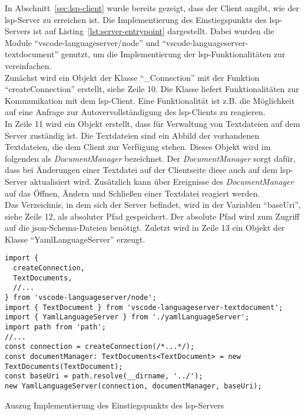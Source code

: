 In Abschnitt~\ref{sec:lsp-client} wurde bereits gezeigt, dass der Client angibt, wie der \ac{lsp}-Server zu erreichen ist.
Die Implementierung des Einstiegspunkts des \ac{lsp}-Servers ist auf Listing~\ref{lst:server-entrypoint} dargestellt.
Dabei wurden die Module ``vscode-languageserver/node'' und ``vscode-languageserver-textdocument'' genutzt, um die
Implementierung der \ac{lsp}-Funktionalitäten zur vereinfachen.
\\
Zunächst wird ein Objekt der Klasse ``\_Connection'' mit der Funktion ``createConnection'' erstellt, siehe Zeile 10.
Die Klasse liefert Funktionalitäten zur Kommunikation mit dem \ac{lsp}-Client.
Eine Funktionalität ist z.B. die Möglichkeit auf eine Anfrage zur Autovervollständigung des \ac{lsp}-Clients zu reagieren.
\\
In Zeile 11 wird ein Objekt erstellt, dass für Verwaltung von Textdateien auf dem Server zuständig ist.
Die Textdateien sind ein Abbild der vorhandenen Textdateien, die dem Client zur Verfügung stehen.
Dieses Objekt wird im folgenden als \textit{DocumentManager} bezeichnet.
Der \textit{DocumentManager} sorgt dafür, dass bei Änderungen einer Textdatei auf der Clientseite diese auch auf dem \ac{lsp}-Server aktualisiert wird.
Zusätzlich kann über Ereignisse des \textit{DocumentManager} auf das Öffnen, Ändern und Schließen einer Textdatei reagiert werden.
\\
Das Verzeichnis, in dem sich der Server befindet, wird in der Variablen ``baseUri'', siehe Zeile 12, als absoluter Pfad gespeichert.
Der absolute Pfad wird zum Zugriff auf die \ac{json}-Schema-Dateien benötigt.
Zuletzt wird in Zeile 13 ein Objekt der Klasse ``YamlLanguageServer'' erzeugt.

\begin{listing}[htp]
  \begin{verbatim}
import { 
  createConnection, 
  TextDocuments, 
  //...
} from 'vscode-languageserver/node';
import { TextDocument } from 'vscode-languageserver-textdocument';
import { YamlLanguageServer } from './yamlLanguageServer';
import path from 'path';
//...
const connection = createConnection(/*...*/);
const documentManager: TextDocuments<TextDocument> = new TextDocuments(TextDocument);
const baseUri = path.resolve(__dirname, '../');
new YamlLanguageServer(connection, documentManager, baseUri);
      \end{verbatim}
  \caption{Auszug Implementierung des Einstiegspunkts des \acs{lsp}-Servers}
  \label{lst:server-entrypoint}
\end{listing}


